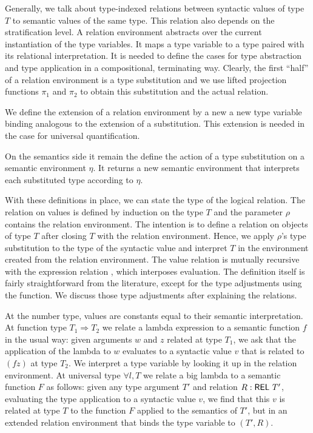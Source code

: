 \documentclass[acmsmall,anonymous,review,screen]{acmart}
\begin{document}
Generally, we talk about type-indexed relations {\AREL} between syntactic values of type $T$ to semantic values of the same
type. This relation also depends on the stratification level.
\LogicalREL
A relation environment {\ARelEnv} abstracts over the current instantiation of the
type variables. It maps a type variable to a
type paired with its relational interpretation.  It is needed to
define the cases for type abstraction and type application in a
compositional, terminating way.
\LogicalRelEnv
Clearly, the first ``half'' of a relation environment is a type
substitution and we use lifted projection functions $\pi_1$ and $\pi_2$ to obtain this
substitution and the actual relation.

We define the extension of a relation environment by a new a new type
variable binding analogous to the extension
of a substitution. This extension is needed in the case for universal
quantification.
\LogicalREext

On the semantics side it remain the define the action of a type
substitution on a semantic environment $\eta$. It returns a new
semantic environment that interprets each substituted type according
to $\eta$.
\TFsubstToEnv

With these definitions in place, we can state the type of the logical relation.
\LogicalMCVType
The  relation {\AVSem} on values is defined by induction on the type $T$ and the parameter
$\rho$ contains the relation environment. The intention is to define a
relation on objects of type $T$ after closing $T$ with the relation
environment. Hence, we apply $\rho$'s type substitution to the type of
the syntactic value and interpret $T$ in the environment created from
the relation environment.
The value relation is mutually recursive with the expression relation
{\AESem}, which interposes evaluation.
\LogicalMCVBody
The definition itself is fairly straightforward from the literature,
except for the type adjustments using the {\Asubst} function. We
discuss those type adjustments after explaining the relations.

At the number type, values are constants equal to their semantic
interpretation. 
 At function type $T_1 \Rightarrow T_2$ we relate a lambda expression
to a semantic function $f$ in
the usual way: given arguments $w$ and $z$ related at type $T_1$, we ask that the
application of the lambda to $w$ evaluates to a syntactic value $v$ that is
related to $(f z)$ at type $T_2$.
We interpret a type variable by looking it up in the relation
environment.
At universal type $\forall l, T$ we relate a big lambda to a semantic
function $F$ as follows: given any type argument $T'$ and relation $R :
\AREL\ T'$, evaluating the type application to a syntactic value $v$,
we find that this $v$ is related at type $T$ to the
function $F$ applied to the semantics of $T'$, but in an extended
relation environment that binds the type variable to $(T', R)$.
\end{document}

